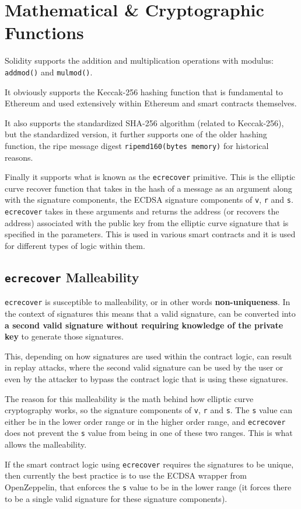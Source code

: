 \section{Mathematical \& Cryptographic
Functions}\label{mathematical-cryptographic-functions}

Solidity supports the addition and multiplication operations with
modulus: \texttt{addmod()} and \texttt{mulmod()}.

It obviously supports the Keccak-256 hashing function that is
fundamental to Ethereum and used extensively within Ethereum and smart
contracts themselves.

It also supports the standardized SHA-256 algorithm (related to
Keccak-256), but the standardized version, it further supports one of
the older hashing function, the ripe message digest
\texttt{ripemd160(bytes\ memory)} for historical reasons.

Finally it supports what is known as the \texttt{ecrecover} primitive.
This is the elliptic curve recover function that takes in the hash of a
message as an argument along with the signature components, the ECDSA
signature components of \texttt{v}, \texttt{r} and \texttt{s}.
\texttt{ecrecover} takes in these arguments and returns the address (or
recovers the address) associated with the public key from the elliptic
curve signature that is specified in the parameters. This is used in
various smart contracts and it is used for different types of logic
within them.

\subsection{\texorpdfstring{\texttt{ecrecover}
Malleability}{ecrecover Malleability}}\label{ecrecover-malleability}

\texttt{ecrecover} is susceptible to malleability, or in other words
\textbf{non-uniqueness}. In the context of signatures this means that a
valid signature, can be converted into \textbf{a second valid signature
without requiring knowledge of the private key} to generate those
signatures.

This, depending on how signatures are used within the contract logic,
can result in replay attacks, where the second valid signature can be
used by the user or even by the attacker to bypass the contract logic
that is using these signatures.

The reason for this malleability is the math behind how elliptic curve
cryptography works, so the signature components of \texttt{v},
\texttt{r} and \texttt{s}. The \texttt{s} value can either be in the
lower order range or in the higher order range, and \texttt{ecrecover}
does not prevent the \texttt{s} value from being in one of these two
ranges. This is what allows the malleability.

If the smart contract logic using \texttt{ecrecover} requires the
signatures to be unique, then currently the best practice is to use the
ECDSA wrapper from OpenZeppelin, that enforces the \texttt{s} value to
be in the lower range (it forces there to be a single valid signature
for these signature components).
